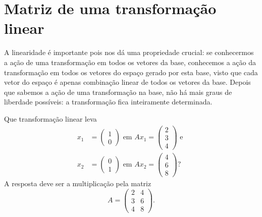 \section{Matriz de uma transformação linear}

A linearidade é importante pois nos dá uma propriedade crucial: se conhecermos a ação de uma transformação em todos os vetores da base, conhecemos a ação da transformação em todos os vetores do espaço gerado por esta base, visto que cada vetor do espaço é apenas combinação linear de todos os vetores da base. Depois que sabemos a ação de uma transformação na base, não há mais graus de liberdade possíveis: a transformação fica inteiramente determinada.

\begin{exemplo}
  Que transformação linear leva 
  \begin{align*}
    x_1 &= 
    \begin{pmatrix}
       1\\
       0
    \end{pmatrix}
    \text{ em } Ax_1 =
    \begin{pmatrix}
       2\\
       3\\
       4
    \end{pmatrix}
    \text{ e }\\
    x_2 &=
    \begin{pmatrix}
       0\\
       1
    \end{pmatrix}
    \text{ em } Ax_2 =
    \begin{pmatrix}
       4\\
       6\\
       8
    \end{pmatrix}
    ?
  \end{align*}
  A resposta deve ser a multiplicação pela matriz 
  \begin{equation*}
     A = \begin{pmatrix} 2 & 4\\ 3 & 6\\ 4 & 8 \end{pmatrix}.
  \end{equation*}
\end{exemplo}

